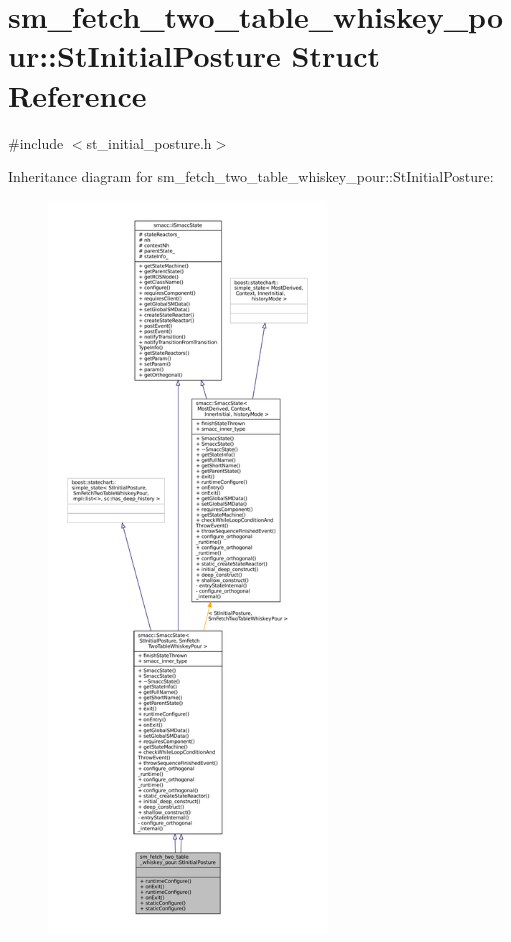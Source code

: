 \hypertarget{structsm__fetch__two__table__whiskey__pour_1_1StInitialPosture}{}\section{sm\+\_\+fetch\+\_\+two\+\_\+table\+\_\+whiskey\+\_\+pour\+:\+:St\+Initial\+Posture Struct Reference}
\label{structsm__fetch__two__table__whiskey__pour_1_1StInitialPosture}


{\ttfamily \#include $<$st\+\_\+initial\+\_\+posture.\+h$>$}



Inheritance diagram for sm\+\_\+fetch\+\_\+two\+\_\+table\+\_\+whiskey\+\_\+pour\+:\+:St\+Initial\+Posture\+:
\nopagebreak
\begin{figure}[H]
\begin{center}
\leavevmode
\includegraphics[height=550pt]{structsm__fetch__two__table__whiskey__pour_1_1StInitialPosture__inherit__graph}
\end{center}
\end{figure}


